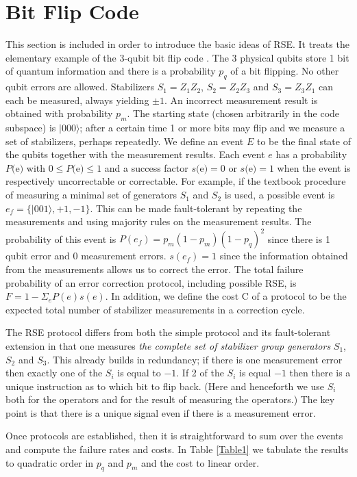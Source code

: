 \documentclass[reprint, superscriptaddress]{revtex4-1}
\numberwithin{equation}{section}
\numberwithin{figure}{section}
\numberwithin{table}{section}
\begin{document}
\section{Bit Flip Code}
This section is included in order to introduce the basic ideas of RSE.  It treats the elementary example of the 3-qubit bit flip code \cite{NielsenChuang}.  The 3 physical qubits store 1 bit of quantum information and there is a probability $p_q$ of a bit flipping.  No other qubit errors are allowed.  Stabilizers $S_1 = Z_1 Z_2$, $S_2 = Z_2 Z_3$ and $S_3 = Z_3 Z_1$ can each be measured, always yielding $\pm 1$.  An incorrect measurement result is obtained with probability $p_m$.  The starting state (chosen arbitrarily in the code subspace) is $ |000 \rangle $; after a certain time 1 or more bits may flip and we measure a set of stabilizers, perhaps repeatedly.  We define an event $E$ to be the final state of the qubits together with the measurement results.  Each event $e$ has a probability $P($e$)$ with $0 \leq P($e$) \leq 1$ and a success factor $s($e$) = 0$ or $s($e$) = 1$ when the event is respectively uncorrectable or correctable.  For example, if the textbook procedure of measuring a minimal set of generators $S_1$ and $S_2$ is used, a possible event is $e_f= \{|001 \rangle ,+1,-1\}$.  This can be made fault-tolerant by repeating the measurements and using majority rules on the measurement results.  The probability of this event is $P(e_f) = p_m (1-p_m) (1-p_q)^2$  since there is 1 qubit error and 0 measurement errors.  $s(e_f) = 1$ since the information obtained from the measurements allows us to correct the error.  The total failure probability of an error correction protocol, including possible RSE, is $F = 1 - \Sigma_e P(e) s(e)$.  In addition, we define the cost C of a protocol to be the expected total number of stabilizer measurements in a correction cycle. 

The RSE protocol differs from both the simple protocol and its fault-tolerant extension in that one measures \textit{ the complete set of stabilizer group generators} $S_1$, $S_2$ and $S_3$.  This already builds in redundancy; if there is one measurement error then exactly one of the $S_i$ is equal to $-1$.  If 2 of the $S_i$ is equal $-1$ then there is a unique instruction as to which bit to flip back. (Here and henceforth we use $S_i$ both for the operators and for the result of measuring the operators.) The key point is that there is a unique signal even if there is a measurement error.

Once protocols are established, then it is straightforward to sum over the events and compute the failure rates and costs.  In Table \ref{Table1} we tabulate the results to quadratic order in $p_q$ and $p_m$ and the cost to linear order.
\end{document}
